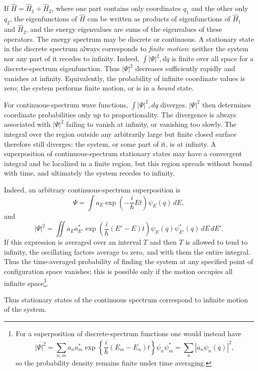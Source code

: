 If $\hat H=\hat H_1+\hat H_2$, where one part contains only coordinates $q_1$
and the other only $q_2$, the eigenfunctions of $\hat H$ can be written as
products of eigenfunctions of $\hat H_1$ and $\hat H_2$, and the energy
eigenvalues are sums of the eigenvalues of these operators.
The energy spectrum may be discrete or continuous. A stationary state in the
discrete spectrum always corresponds to \textit{finite motion}: neither the
system nor any part of it recedes to infinity. Indeed,
$\int|\Psi|^2,dq$ is finite over all space for a discrete-spectrum
eigenfunction. Thus $|\Psi|^2$ decreases sufficiently rapidly and vanishes at
infinity. Equivalently, the probability of infinite coordinate values is zero;
the system performs finite motion, or is in a \textit{bound} state.

For continuous-spectrum wave functions, $\int|\Psi|^2,dq$ diverges.
$|\Psi|^2$ then determines coordinate probabilities only up to
proportionality. The divergence is always associated with $|\Psi|^2$ failing
to vanish at infinity, or vanishing too slowly. The integral over the region
outside any arbitrarily large but finite closed surface therefore still
diverges: the system, or some part of it, is at infinity. A superposition of
continuous-spectrum stationary states may have a convergent integral and be
localized in a finite region, but this region spreads without bound with time,
and ultimately the system recedes to infinity.

Indeed, an arbitrary continuous-spectrum superposition is
\[
  \Psi=\int a_E\exp\left(-\frac{i}{\hbar}Et\right)\psi_E(q)\,dE,
\]
and
\[
  |\Psi|^2=\iint a_Ea_{E'}^*\exp\left(\frac{i}{\hbar}(E'-E)t\right)
  \psi_E(q)\psi_{E'}^*(q)\,dE\,dE'.
\]
If this expression is averaged over an interval $T$ and then $T$ is allowed to
tend to infinity, the oscillating factors average to zero, and with them
the entire integral. Thus the time-averaged probability of finding the system
at any specified point of configuration space vanishes; this is possible only
if the motion occupies all infinite space\footnote{For a superposition of
discrete-spectrum functions one would instead have
\[
  \overline{|\Psi|^2}=\overline{\sum_{n,m}a_na_m^*
  \exp\left\{\frac{i}{\hbar}(E_m-E_n)t\right\}\psi_n\psi_m^*}
  =\sum_n|a_n\psi_n(q)|^2,
\]
so the probability density remains finite under time averaging.}.

Thus stationary states of the continuous spectrum correspond to infinite
motion of the system.
